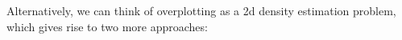\begin{itemize}
    
  
\end{itemize}

Alternatively, we can think of overplotting as a 2d density estimation problem, which gives rise to two more approaches: 
  
